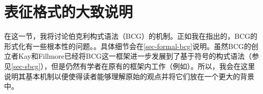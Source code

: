 
\section{表征格式的大致说明}

在这一节，我将讨论伯克利构式语法（BCG）的机制。正如我在指出的，BCG的形式化有一些根本性的问题。。具体细节会在\ref{sec-formal-bcg}说明。虽然BCG的创立者Kay和Fillmore已经将BCG这一框架进一步发展到了基于符号的构式语法（参见\ref{sec-sbcg}），但是仍然有学者在原有的框架内工作（例如\citealp{Fried2013a-u}）。所以，我会在这里说明其基本机制以便使得读者能够理解原始的观点并将它们放在一个更大的背景中。

